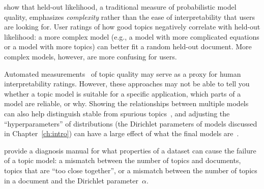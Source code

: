\citet{chang-09b} show that
held-out likelihood, a traditional measure of probabilistic model quality,
emphasizes \emph{complexity} rather than the ease of interpretability
that users are looking for.  
User ratings of how good topics negatively correlate with
held-out likelihood: a more complex model (e.g., a model with more
complicated equations or a model with more topics) can better fit a random
held-out document. 
More complex models, however, are more confusing for users. 

Automated measurements~\citep{newman-10,mimno-11,lau-14} of topic
quality may serve as a proxy for human interpretability ratings.
However, these approaches may not be able to tell you
whether a topic model is suitable for a specific application, which parts of a model are reliable, or why.
Showing the relationships between multiple models can also help
distinguish stable from spurious topics~\citep{chuang-15}, and
adjusting the ``hyperparameters'' of distributions (the Dirichlet
parameters of models discussed in Chapter~\ref{ch:intro}) can have a
large effect of what the final models are~\citep{wallach-09b}.

\citet{tang-14} provide a diagnosis manual for what properties of a
dataset can cause the failure of a topic model: a mismatch between the
number of topics and documents, topics that are ``too close
together'', or a mismatch between the number of topics in a document
and the Dirichlet parameter~$\alpha$.

